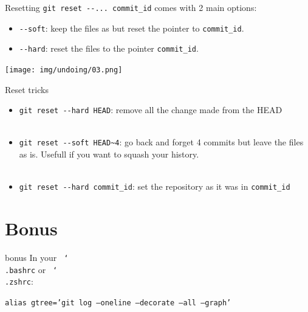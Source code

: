 \documentclass[usenames,dvipsnames,9pt]{beamer}
\begin{document}
\begin{frame}{Resetting}
\lstinline|git reset --... commit_id| comes with 2 main options:
\begin{itemize}
  \item \lstinline|--soft|: keep the files as but reset the pointer to \lstinline|commit_id|.
  \item \lstinline|--hard|: reset the files to the pointer \lstinline|commit_id|.
\end{itemize}

\vspace{0.5cm}
\texttt{[image: img/undoing/03.png]}

\end{frame}

\begin{frame}{Reset tricks}

\begin{itemize}
  \item \lstinline|git reset --hard HEAD|: remove all the change made from the HEAD\\~\\
  \item \lstinline|git reset --soft HEAD~4|: go back and forget 4 commits but leave the files as is. Usefull if you want to squash your history.\\~\\
  \item \lstinline|git reset --hard commit_id|: set the repository as it was in \lstinline|commit_id|
\end{itemize}

\end{frame}



%
%

\section{Bonus}


\begin{frame}[fragile]{bonus}
  In your \texttt{~\char`\\.bashrc} or \texttt{~\char`\\.zshrc}:

  \texttt{alias gtree='git log --oneline --decorate --all --graph'}
\end{frame}



\end{document}
